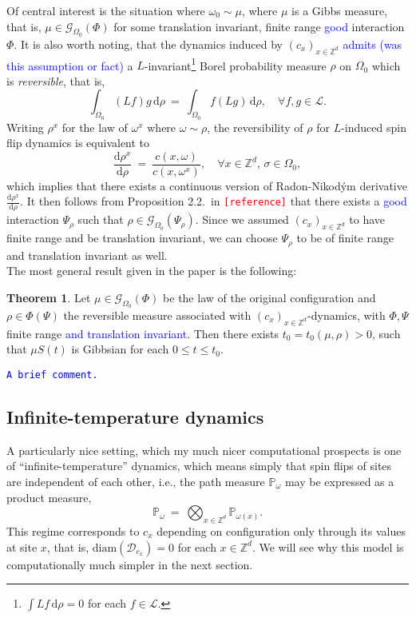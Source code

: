 \documentclass[12pt]{article}
\newcommand{\D}{\mathcal{D}}
\renewcommand{\d}{\mathrm{d}}
\newcommand{\G}{\mathcal{G}}
\newcommand{\Loc}{\mathcal{L}}
\renewcommand{\P}{\mathbb{P}}
\newcommand{\Z}{\mathbb{Z}}
\newcommand{\1}{\mathbbm{1}}
\newcommand{\5}{\vspace{0.5cm}}
\theoremstyle{definition}
\newtheorem{thm}{Theorem}[section]
\begin{document}
Of central interest is the situation where $\omega_0\sim\mu$, where $\mu$ is a Gibbs measure, that is, $\mu\in\G_{\Omega_0}(\Phi)$ for some translation invariant, finite range \textcolor{blue}{good} interaction $\Phi$. It is also worth noting, that the dynamics induced by $(c_x)_{x\in\Z^d}$ \textcolor{blue}{admits (was this assumption or fact)} a $L$-invariant\footnote{$\int Lf\,\d\rho=0$ for each $f\in\Loc$.} Borel probability measure $\rho$ on $\Omega_0$ which is \textit{reversible}, that is,
$$\int_{\Omega_0}(Lf)g\,\d\rho ~=~ \int_{\Omega_0}f(Lg)\,\d\rho, \quad \forall f,g\in\Loc.$$
Writing $\rho^x$ for the law of $\omega^x$ where $\omega\sim\rho$, the reversibility of $\rho$ for $L$-induced spin flip dynamics is equivalent to
$$\frac{\d\rho^x}{\d\rho} ~=~ \frac{c(x,\omega)}{c(x,\omega^x)}, \quad \forall x\in\Z^d,\,\sigma\in\Omega_0,$$
which implies that there exists a continuous version of Radon-Nikod\'ym derivative $\frac{\d\rho^x}{\d\rho}$. It then follows from Proposition 2.2.~in \textcolor{red}{\texttt{[reference]}} that there exists a \textcolor{blue}{good} interaction $\Psi_\rho$ such that $\rho\in\G_{\Omega_0}(\Psi_\rho)$. Since we assumed $(c_{x})_{x\in\Z^d}$ to have finite range and be translation invariant, we can choose $\Psi_\rho$ to be of finite range and translation invariant as well.\\

The most general result given in the paper is the following:

\begin{thm}
Let $\mu\in\G_{\Omega_0}(\Phi)$ be the law of the original configuration and $\rho\in\Phi(\Psi)$ the reversible measure associated with $(c_x)_{x\in\Z^d}$-dynamics, with $\Phi,\Psi$ finite range \textcolor{blue}{and translation invariant}. Then there exists $t_0=t_0(\mu,\rho)>0$, such that $\mu S(t)$ is Gibbsian for each $0\leq t\leq t_0$. 
\end{thm}

\textcolor{blue}{\texttt{A brief comment.}}
 

\subsection{Infinite-temperature dynamics}

A particularly nice setting, which my much nicer computational prospects is one of ``infinite-temperature'' dynamics, which means simply that spin flips of sites are independent of each other, i.e., the path measure $\P_\omega$ may be expressed as a product measure,
$$\P_\omega ~=~ \bigotimes_{x\in\Z^d}\P_{\omega(x)}.$$
This regime corresponds to $c_x$ depending on configuration only through its values at site $x$, that is, $\mathrm{diam}(\D_{c_x})=0$ for each $x\in\Z^d$. We will see why this model is computationally much simpler in the next section. \\
\end{document}

